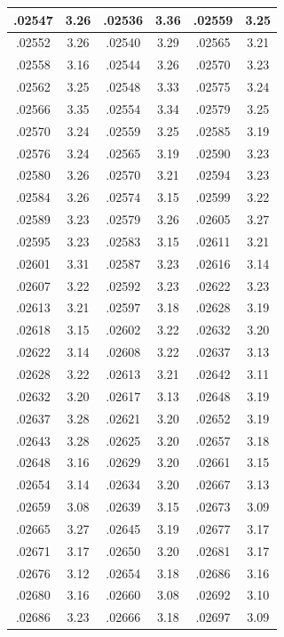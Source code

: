 \documentclass[10pt,twoside]{report}
\begin{document}
\begin{appendices}
\begin{longtable}{|c|c||c|c||c|c|}
.02547 & 3.26 & .02536 & 3.36 & .02559 & 3.25\\\hline
.02552 & 3.26 & .02540 & 3.29 & .02565 & 3.21\\\hline
.02558 & 3.16 & .02544 & 3.26 & .02570 & 3.23\\\hline
.02562 & 3.25 & .02548 & 3.33 & .02575 & 3.24\\\hline
.02566 & 3.35 & .02554 & 3.34 & .02579 & 3.25\\\hline
.02570 & 3.24 & .02559 & 3.25 & .02585 & 3.19\\\hline
.02576 & 3.24 & .02565 & 3.19 & .02590 & 3.23\\\hline
.02580 & 3.26 & .02570 & 3.21 & .02594 & 3.23\\\hline
.02584 & 3.26 & .02574 & 3.15 & .02599 & 3.22\\\hline
.02589 & 3.23 & .02579 & 3.26 & .02605 & 3.27\\\hline
.02595 & 3.23 & .02583 & 3.15 & .02611 & 3.21\\\hline
.02601 & 3.31 & .02587 & 3.23 & .02616 & 3.14\\\hline
.02607 & 3.22 & .02592 & 3.23 & .02622 & 3.23\\\hline
.02613 & 3.21 & .02597 & 3.18 & .02628 & 3.19\\\hline
.02618 & 3.15 & .02602 & 3.22 & .02632 & 3.20\\\hline
.02622 & 3.14 & .02608 & 3.22 & .02637 & 3.13\\\hline
.02628 & 3.22 & .02613 & 3.21 & .02642 & 3.11\\\hline
.02632 & 3.20 & .02617 & 3.13 & .02648 & 3.19\\\hline
.02637 & 3.28 & .02621 & 3.20 & .02652 & 3.19\\\hline
.02643 & 3.28 & .02625 & 3.20 & .02657 & 3.18\\\hline
.02648 & 3.16 & .02629 & 3.20 & .02661 & 3.15\\\hline
.02654 & 3.14 & .02634 & 3.20 & .02667 & 3.13\\\hline
.02659 & 3.08 & .02639 & 3.15 & .02673 & 3.09\\\hline
.02665 & 3.27 & .02645 & 3.19 & .02677 & 3.17\\\hline
.02671 & 3.17 & .02650 & 3.20 & .02681 & 3.17\\\hline
.02676 & 3.12 & .02654 & 3.18 & .02686 & 3.16\\\hline
.02680 & 3.16 & .02660 & 3.08 & .02692 & 3.10\\\hline
.02686 & 3.23 & .02666 & 3.18 & .02697 & 3.09\\\hline

\end{longtable}
\end{appendices}
\end{document}
